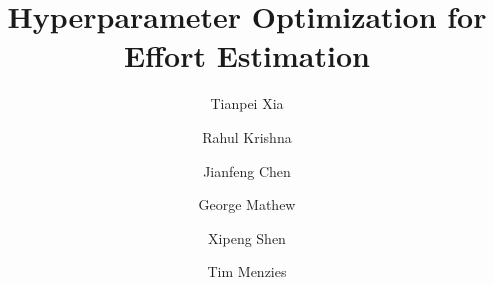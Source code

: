 \newcommand{\wbox}[1] { \crule[black!#1]{0.67cm}{0.4cm} 
\hspace{-0.51cm}\scalebox{1}[1.0]{{\textcolor{white}{{\bf $^{#1}$}}}\hspace{0.1mm}}}


\newcommand{\quart}[4]{
\begin{picture}(100,6)%
    {
        \color{black}
        \put(#3,3)
        {\circle*{4}}
        \put(#1,3)
        {\line(1,0){#2}}
    }
\end{picture}
}

\newcommand{\ofr} {
{\textit{out-of-range}}
}


\usepackage[framemethod=tikz]{mdframed}
\usetikzlibrary{shadows}
\usepackage{graphics}

\newenvironment{result}[2]
{\begin{myshadowbox}\textbf{\textit{\underline{Lesson#1:}}} #2}{ 
\end{myshadowbox}}
    
\newcommand{\nm}[1]{\hline\multicolumn{1}{c}{\cellcolor{black} { {\bf \textcolor{white}{#1}}}}}
%
%
%
%
%


\title{Hyperparameter Optimization  for    Effort Estimation
}


\author{Tianpei Xia         \and
        Rahul Krishna         \and
        Jianfeng Chen         \and
        George Mathew         \and
        Xipeng Shen         \and
        Tim Menzies         
}



